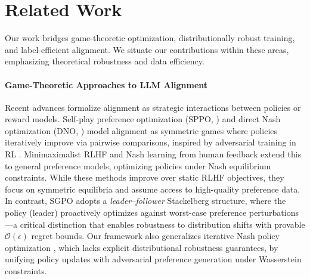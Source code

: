 
\section{Related Work}
\label{sec:related_work }

Our work bridges game-theoretic optimization, distributionally robust training, and label-efficient alignment. We situate our contributions within these areas, emphasizing theoretical robustness and data efficiency.

\paragraph{Game-Theoretic Approaches to LLM Alignment}
Recent advances formalize alignment as strategic interactions between policies or reward models. Self-play preference optimization (SPPO, \citealp{Chen2024SelfPlay}) and direct Nash optimization (DNO, \citealp{Rosset2024DirectNO}) model alignment as symmetric games where policies iteratively improve via pairwise comparisons, inspired by adversarial training in RL \citep{Balduzzi2018RepeatedSG}. Minimaximalist RLHF \citep{Zhu2024MinimaximalistRF} and Nash learning from human feedback \citep{Tien2024NashLF} extend this to general preference models, optimizing policies under Nash equilibrium constraints. While these methods improve over static RLHF objectives, they focus on symmetric equilibria and assume access to high-quality preference data. In contrast, SGPO adopts a \emph{leader--follower} Stackelberg structure, where the policy (leader) proactively optimizes against worst-case preference perturbations—a critical distinction that enables robustness to distribution shifts with provable $\mathcal{O}(\epsilon)$ regret bounds. Our framework also generalizes iterative Nash policy optimization \citep{Feng2024IterativeNP}, which lacks explicit distributional robustness guarantees, by unifying policy updates with adversarial preference generation under Wasserstein constraints.

